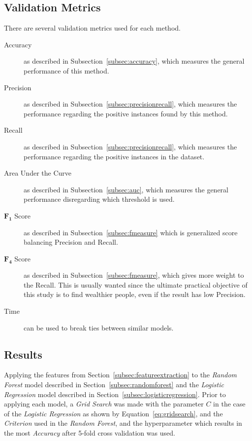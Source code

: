 \subsection{Validation Metrics}
\label{subsec:validationmetrics}
There are several validation metrics used for each method.

\begin{description}
	\item[Accuracy] as described in Subsection~\ref{subsec:accuracy}, which measures the general performance of this method.
	\item[Precision] as described in Subsection~\ref{subsec:precisionrecall}, which measures the performance regarding the positive instances found by this method.
	\item[Recall] as described in Subsection~\ref{subsec:precisionrecall}, which measures the performance regarding the positive instances in the dataset.
	\item[Area Under the Curve] as described in Subsection~\ref{subsec:auc}, which measures the general performance disregarding which threshold is used.
	\item[$\mathbf{F_1}$ Score] as described in Subsection~\ref{subsec:fmeasure} which is generalized score balancing Precision and Recall.
	\item[$\mathbf{F_4}$ Score] as described in Subsection~\ref{subsec:fmeasure}, which gives more weight to the Recall. This is usually wanted since the ultimate practical objective of this study is to find wealthier people, even if the result has low Precision.
	\item[Time] can be used to break ties between similar models.
\end{description}

\subsection{Results}

Applying the features from Section~\ref{subsec:featureextraction} to the \emph{Random Forest} model described in Section~\ref{subsec:randomforest} and the \emph{Logistic Regression} model described in Section~\ref{subsec:logisticregression}. Prior to applying each model, a \emph{Grid Search} was made with the parameter $C$ in the case of the \emph{Logistic Regression} as shown by Equation~\ref{eq:gridsearch}, and the \emph{Criterion} used in the \emph{Random Forest}, and the hyperparameter which results in the most \emph{Accuracy} after 5-fold cross validation was used.

